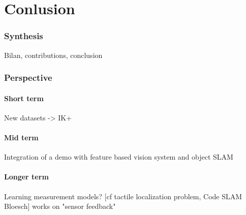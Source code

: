 \part{Conlusion}

\section{Synthesis}
Bilan, contributions, conclusion

\section{Perspective}
\subsection{Short term}
New datasets -> IK+\apriltag

\subsection{Mid term}
Integration of a demo with feature based vision system and object SLAM

\subsection{Longer term}
Learning measurement models? [cf tactile localization problem, Code SLAM Bloesch]
works on "sensor feedback"

